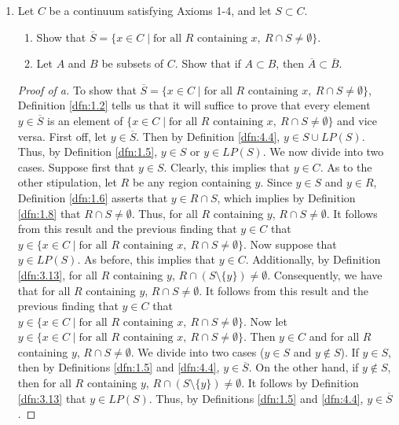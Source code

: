 \documentclass[../main.tex]{subfiles}
\begin{document}
\begin{enumerate}
\begin{proof}[Proof of b]
    \end{proof}
    \item Let $C$ be a continuum satisfying Axioms 1-4, and let $S\subset C$.
    \begin{enumerate}
        \item Show that $\overline{S}=\{x\in C\mid \text{for all }R\text{ containing }x,\ R\cap S\neq\emptyset\}$.
        \item Let $A$ and $B$ be subsets of $C$. Show that if $A\subset B$, then $\overline{A}\subset\overline{B}$.
    \end{enumerate}
    \begin{proof}[Proof of a]
        To show that $\overline{S}=\{x\in C\mid \text{for all }R\text{ containing }x,\ R\cap S\neq\emptyset\}$, Definition \ref{dfn:1.2} tells us that it will suffice to prove that every element $y\in\overline{S}$ is an element of $\{x\in C\mid \text{for all }R\text{ containing }x,\ R\cap S\neq\emptyset\}$ and vice versa. First off, let $y\in\overline{S}$. Then by Definition \ref{dfn:4.4}, $y\in S\cup LP(S)$. Thus, by Definition \ref{dfn:1.5}, $y\in S$ or $y\in LP(S)$. We now divide into two cases. Suppose first that $y\in S$. Clearly, this implies that $y\in C$. As to the other stipulation, let $R$ be any region containing $y$. Since $y\in S$ and $y\in R$, Definition \ref{dfn:1.6} asserts that $y\in R\cap S$, which implies by Definition \ref{dfn:1.8} that $R\cap S\neq\emptyset$. Thus, for all $R$ containing $y$, $R\cap S\neq\emptyset$. It follows from this result and the previous finding that $y\in C$ that $y\in\{x\in C\mid \text{for all }R\text{ containing }x,\ R\cap S\neq\emptyset\}$. Now suppose that $y\in LP(S)$. As before, this implies that $y\in C$. Additionally, by Definition \ref{dfn:3.13}, for all $R$ containing $y$, $R\cap(S\setminus\{y\})\neq\emptyset$. Consequently, we have that for all $R$ containing $y$, $R\cap S\neq\emptyset$. It follows from this result and the previous finding that $y\in C$ that $y\in\{x\in C\mid \text{for all }R\text{ containing }x,\ R\cap S\neq\emptyset\}$. Now let $y\in\{x\in C\mid \text{for all }R\text{ containing }x,\ R\cap S\neq\emptyset\}$. Then $y\in C$ and for all $R$ containing $y$, $R\cap S\neq\emptyset$. We divide into two cases ($y\in S$ and $y\notin S$). If $y\in S$, then by Definitions \ref{dfn:1.5} and \ref{dfn:4.4}, $y\in\overline{S}$. On the other hand, if $y\notin S$, then for all $R$ containing $y$, $R\cap(S\setminus\{y\})\neq\emptyset$. It follows by Definition \ref{dfn:3.13} that $y\in LP(S)$. Thus, by Definitions \ref{dfn:1.5} and \ref{dfn:4.4}, $y\in\overline{S}$.

\end{proof}
\end{enumerate}
\end{document}
